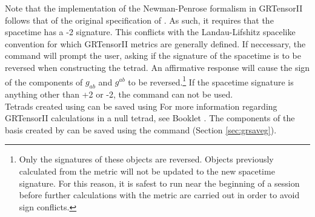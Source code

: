 \documentclass{article}
\begin{document}
Note that the implementation of the Newman-Penrose formalism in
GRTensorII follows that of the original specification of
\cite{newman/penrose:1962}. As such, it requires that the spacetime
has a -2 signature. This conflicts with the Landau-Lifshitz spacelike
convention for which GRTensorII metrics are generally defined. If
neccessary, the  command will prompt the user, asking
if the signature of the spacetime is to be reversed when constructing
the tetrad. An affirmative response will cause the sign of the
components of $g_{ab}$ and $g^{ab}$ to be reversed.\footnote{Only the
signatures of these objects are reversed. Objects previously calculated
from the metric will not be updated to the new spacetime
signature. For this reason, it is safest to run  near
the beginning of a session before further calculations with the metric
are carried out in order to avoid sign conflicts.} If the spacetime
signature is anything other than +2 or -2, the 
command can not be used.\\

Tetrads created using  can be saved using 
For more information regarding GRTensorII calculations in a null
tetrad, see Booklet \grBasisRef.  The components of the basis created
by  can be saved using the  command
(Section \ref{sec:grsaveg}).
%
\end{document}
